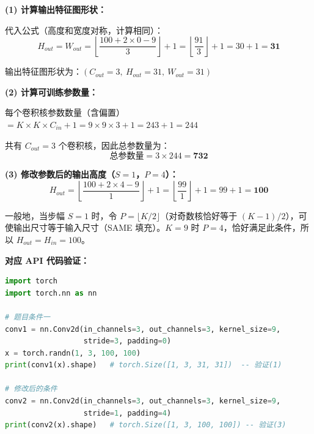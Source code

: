 \documentclass[a4paper,11pt]{ctexart}
\begin{document}
\begin{solutionbox}[参考答案与详细解析]
    \textbf{(1) 计算输出特征图形状：}

    代入公式（高度和宽度对称，计算相同）：
    \begin{equation}
        H_{out} = W_{out} = \left\lfloor \frac{100 + 2\times0 - 9}{3} \right\rfloor + 1
        = \left\lfloor \frac{91}{3} \right\rfloor + 1
        = 30 + 1 = \mathbf{31}
    \end{equation}

    输出特征图形状为：$\boxed{(C_{out}=3,\ H_{out}=31,\ W_{out}=31)}$

    \vspace{0.5em}
    \textbf{(2) 计算可训练参数量：}

    每个卷积核参数数量（含偏置）$= K \times K \times C_{in} + 1 = 9 \times 9 \times 3 + 1 = 243 + 1 = 244$

    共有 $C_{out} = 3$ 个卷积核，因此总参数量为：
    \begin{equation}
        \text{总参数量} = 3 \times 244 = \mathbf{732}
    \end{equation}

    \vspace{0.5em}
    \textbf{(3) 修改参数后的输出高度（$S=1$，$P=4$）：}
    \begin{equation}
        H_{out} = \left\lfloor \frac{100 + 2\times4 - 9}{1} \right\rfloor + 1
        = \left\lfloor \frac{99}{1} \right\rfloor + 1
        = 99 + 1 = \mathbf{100}
    \end{equation}

    \begin{keybox}[结论：$P=4$，$K=9$，$S=1$ 时输出尺寸与输入相同！]
        一般地，当步幅 $S=1$ 时，令 $P = \lfloor K/2 \rfloor$（对奇数核恰好等于 $(K-1)/2$），可使输出尺寸等于输入尺寸（SAME 填充）。$K=9$ 时 $P=4$，恰好满足此条件，所以 $H_{out} = H_{in} = 100$。
    \end{keybox}

    \textbf{对应 API 代码验证：}
    \begin{lstlisting}[language=Python]
import torch
import torch.nn as nn

# 题目条件一
conv1 = nn.Conv2d(in_channels=3, out_channels=3, kernel_size=9,
                  stride=3, padding=0)
x = torch.randn(1, 3, 100, 100)
print(conv1(x).shape)   # torch.Size([1, 3, 31, 31])  -- 验证(1)

# 修改后的条件
conv2 = nn.Conv2d(in_channels=3, out_channels=3, kernel_size=9,
                  stride=1, padding=4)
print(conv2(x).shape)   # torch.Size([1, 3, 100, 100]) -- 验证(3)
    \end{lstlisting}
\end{solutionbox}
\end{document}
